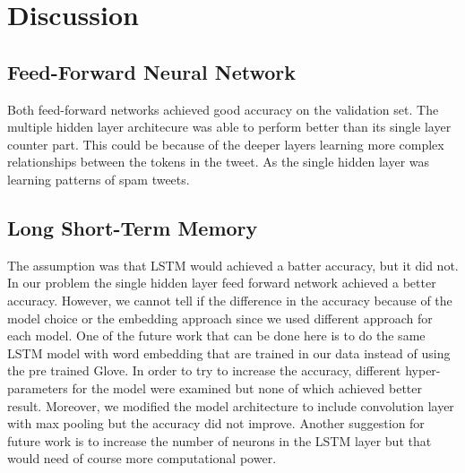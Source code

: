 \section{Discussion}
\label{sec:discussion}

\subsection{Feed-Forward Neural Network} Both feed-forward networks
achieved good accuracy on the validation set. The multiple hidden
layer architecure was able to perform better than its single layer
counter part. This could be because of the deeper layers learning more
complex relationships between the tokens in the tweet. As the single
hidden layer was learning patterns of spam tweets.

\subsection{Long Short-Term Memory }
The assumption was that LSTM would achieved a batter accuracy, but it did not. In our problem the single hidden layer feed forward network achieved a better accuracy. However, we cannot tell if the difference in the accuracy because of the model choice or the embedding approach since we used different approach for each model. One of the future work that can be done here is to do the same LSTM model with word embedding that are trained in our data instead of using the pre trained Glove. 
In order to try to increase the accuracy, different hyper-parameters for the model were examined but none of which achieved better result. Moreover, we modified the model architecture to include convolution layer with max pooling but the accuracy did not improve. Another suggestion for future work is to increase the number of neurons in the LSTM layer but that would need of course more computational power. 

